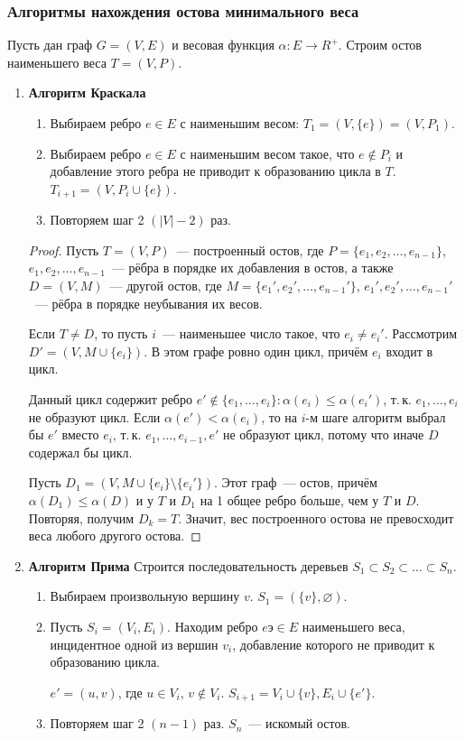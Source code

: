 \subsubsection{Алгоритмы нахождения остова минимального веса}
Пусть дан граф $G = (V, E)$ и весовая функция $\alpha \colon E \to R^+$. Строим остов наименьшего веса $T = (V, P)$.
\begin{enumerate}
	\item\textbf{Алгоритм Краскала}
	\begin{enumerate}
		\item Выбираем ребро $e \in E$ с наименьшим весом: $T_1 = (V, \{ e \}) = (V, P_1)$.
		\item Выбираем ребро $e \in E$ с наименьшим весом такое, что $e \notin P_i$ и добавление этого ребра не приводит к образованию цикла в $T$. $T _{i+1} = (V, P_i \cup \{ e \})$.
		\item Повторяем шаг 2 $(|V| - 2)$ раз.
	\end{enumerate}
	\begin{proof}
		Пусть $T = (V, P)$~--- построенный остов, где $P = \{ e_1, e_2, \ldots, e_{n-1} \}$, $e_1, e_2, \ldots, e_{n-1}$~--- рёбра в порядке их добавления в остов, а также $D = (V, M)$~--- другой остов, где $M = \{ e_1', e_2', \ldots, e_{n-1}' \}$, $e_1', e_2', \ldots, e_{n-1}'$~--- рёбра в порядке неубывания их весов.
		
		Если $T \neq D$, то пусть $i$~--- наименьшее число такое, что $e_i \neq e_i'$. Рассмотрим $D' = (V, M \cup \{ e_i \})$. В этом графе ровно один цикл, причём $e_i$ входит в цикл.
		
		Данный цикл содержит ребро $e' \notin \{ e_1, \ldots, e_i \} \colon \alpha(e_i) \leqslant \alpha(e_i')$, т.\,к. $e_1, \ldots, e_i$ не образуют цикл. Если $\alpha(e') < \alpha(e_i)$, то на $i$-м шаге алгоритм выбрал бы $e'$ вместо $e_i$, т.\,к. $e_1, \ldots, e_{i-1}, e'$ не образуют цикл, потому что иначе $D$ содержал бы цикл.
		
		Пусть $D_1 = (V, M \cup \{ e_i\} \setminus \{ e_i' \})$. Этот граф~--- остов, причём $\alpha(D_1) \leqslant \alpha(D)$ и у $T$ и $D_1$ на 1 общее ребро больше, чем у $T$ и $D$. Повторяя, получим $D_k = T$. Значит, вес построенного остова не превосходит веса любого другого остова.
	\end{proof}

	\item\textbf{Алгоритм Прима}
	Строится последовательность деревьев $S_1 \subset S_2 \subset \ldots \subset S_n$.
	\begin{enumerate}
		\item Выбираем произвольную вершину $v$. $S_1 = (\{ v \}, \varnothing)$.
		\item Пусть $S_i = (V_i, E_i)$. Находим ребро $eэ \in E$ наименьшего веса, инцидентное одной из вершин $v_i$, добавление которого не приводит к образованию цикла.
		
		$e' = (u, v)$, где $u \in V_i$, $v \notin V_i$. $S_{i+1} = {V_i \cup \{ v \}, E_i \cup \{ e' \}}$.
		\item Повторяем шаг 2 $(n - 1)$ раз. $S_n$~--- искомый остов.
	\end{enumerate}
\end{enumerate}